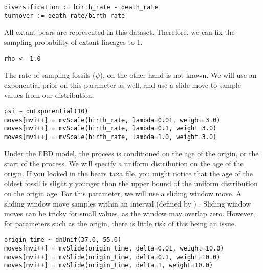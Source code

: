 {\tt \begin{snugshade*}
\begin{lstlisting}
diversification := birth_rate - death_rate
turnover := death_rate/birth_rate
\end{lstlisting}
\end{snugshade*}}

All extant bears are represented in this dataset. Therefore, we can fix the sampling probability of extant lineages to 1.

{\tt \begin{snugshade*}
\begin{lstlisting}
rho <- 1.0
\end{lstlisting}
\end{snugshade*}}

The rate of sampling fossils ($\psi$), on the other hand is not known. We will use an exponential prior on this parameter as well, and use a slide move to sample values from our distribution.

{\tt \begin{snugshade*}
\begin{lstlisting}
psi ~ dnExponential(10) 
moves[mvi++] = mvScale(birth_rate, lambda=0.01, weight=3.0)
moves[mvi++] = mvScale(birth_rate, lambda=0.1, weight=3.0)
moves[mvi++] = mvScale(birth_rate, lambda=1.0, weight=3.0)
\end{lstlisting}
\end{snugshade*}}

Under the FBD model, the process is conditioned on the age of the origin, or the start of the process. 
We will specify a uniform distribution on the age of the origin. If you looked in the bears taxa file, you might notice that the age of the oldest fossil is slightly younger than the upper bound of the uniform distribution on the origin age. 
For this parameter, we will use a sliding window move. A sliding window move samples within an interval (defined by ) . Sliding window moves can be tricky for small values, as the window may overlap zero. However, for parameters such as the origin, there is little risk of this being an issue.

{\tt \begin{snugshade*}
\begin{lstlisting}
origin_time ~ dnUnif(37.0, 55.0)
moves[mvi++] = mvSlide(origin_time, delta=0.01, weight=10.0)
moves[mvi++] = mvSlide(origin_time, delta=0.1, weight=10.0)
moves[mvi++] = mvSlide(origin_time, delta=1, weight=10.0)
\end{lstlisting}
\end{snugshade*}}

